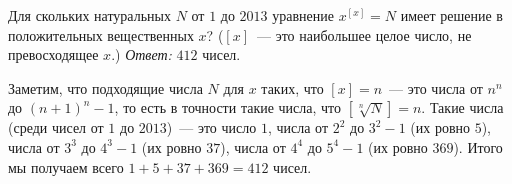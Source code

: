 \problem
Для скольких натуральных $N$ от $1$ до $2013$ уравнение $x^{[x]} = N$ имеет
решение в положительных вещественных $x$?
($[x]$~--- это наибольшее целое число, не превосходящее $x$.)
\solution
\emph{Ответ:} $412$ чисел.
\par
Заметим, что подходящие числа $N$ для $x$ таких, что $[x] = n$~--- это числа от
$n^n$ до $(n+1)^n - 1$, то есть в точности такие числа, что
$[\sqrt[n]{N}] = n$.
Такие числа (среди чисел от $1$ до $2013$)~--- это
число $1$,
числа от $2^2$ до $3^2 - 1$ (их ровно $5$),
числа от $3^3$ до $4^3 - 1$ (их ровно $37$),
числа от $4^4$ до $5^4 - 1$ (их ровно $369$).
Итого мы получаем всего $1 + 5 + 37 + 369 = 412$ чисел.
\endproblem
